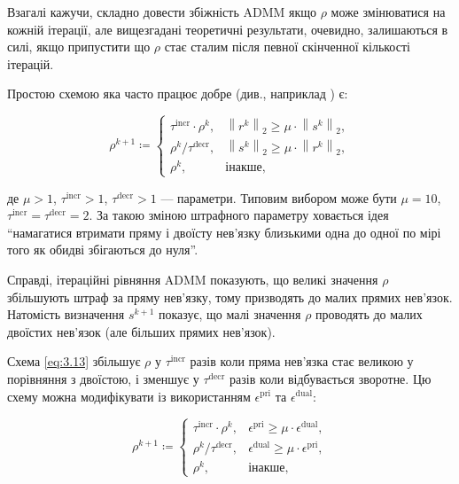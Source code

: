 Взагалі кажучи, складно довести збіжність ADMM якщо $\rho$ може змінюватися на кожній ітерації, але вищезгадані теоретичні результати, очевидно, залишаються в силі, якщо припустити що $\rho$ стає сталим після певної скінченної кількості ітерацій. \medskip

Простою схемою яка часто працює добре (див., наприклад \cite{96, 169}) є:

\begin{equation}
	\label{eq:3.13}
	\rho^{k + 1} \coloneqq \begin{cases} \tau^{\text{incr}} \cdot \rho^k, & \left\|r^k\right\|_2 \ge \mu \cdot \left\|s^k\right\|_2, \\ \rho^k / \tau^{\text{decr}}, & \left\|s^k\right\|_2 \ge \mu \cdot \left\|r^k\right\|_2, \\ \rho^k, & \text{інакше}, \end{cases}
\end{equation}

де $\mu > 1$, $\tau^{\text{incr}} > 1$, $\tau^{\text{decr}} > 1$ --- параметри. Типовим вибором може бути $\mu = 10$, $\tau^{\text{incr}} = \tau^{\text{decr}} = 2$. За такою зміною штрафного параметру ховається ідея ``намагатися втримати пряму і двоїсту нев'язку близькими одна до одної по мірі того як обидві збігаються до нуля''. \medskip

Справді, ітераційні рівняння ADMM показують, що великі значення $\rho$ збільшують штраф за пряму нев'язку, тому призводять до малих прямих нев'язок. Натомість визначення $s^{k + 1}$ показує, що малі значення $\rho$ проводять до малих двоїстих нев'язок (але більших прямих нев'язок). \medskip

Схема \eqref{eq:3.13} збільшує $\rho$ у $\tau^{\text{incr}}$ разів коли пряма нев'язка стає великою у порівняння з двоїстою, і зменшує у $\tau^{\text{decr}}$ разів коли відбувається зворотне. Цю схему можна модифікувати із використанням $\epsilon^{\text{pri}}$ та $\epsilon^{\text{dual}}$:

\begin{equation}
	\rho^{k + 1} \coloneqq \begin{cases} \tau^{\text{incr}} \cdot \rho^k, & \epsilon^{\text{pri}} \ge \mu \cdot \epsilon^{\text{dual}}, \\ \rho^k / \tau^{\text{decr}}, & \epsilon^{\text{dual}} \ge \mu \cdot \epsilon^{\text{pri}}, \\ \rho^k, & \text{інакше}, \end{cases}
\end{equation}


